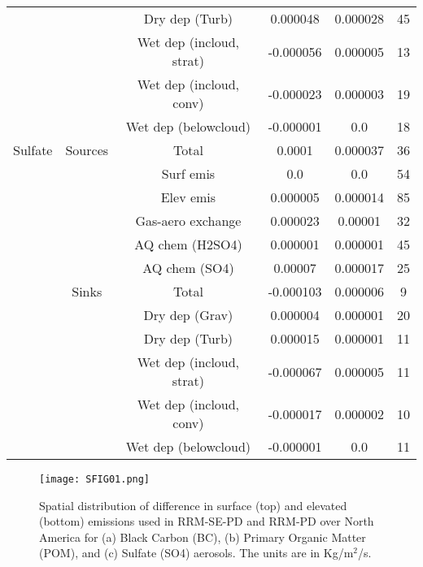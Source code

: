 \documentclass[journal abbreviation, manuscript]{copernicus}
\begin{document}
\begin{table}
\begin{tabular}{c|c|c|c|c|c}
             &      &     Dry dep (Turb) &     0.000048 &     0.000028 &     45 \\
             &      &            Wet dep (incloud, strat) &    -0.000056 &     0.000005 &     13 \\
             &      &            Wet dep (incloud, conv)  &    -0.000023 &     0.000003 &     19 \\
             &      &            Wet dep (belowcloud) &    -0.000001 &          0.0 &     18 \\ \hline
        Sulfate & Sources &              Total &       0.0001 &     0.000037 &     36 \\
             &      &          Surf emis &          0.0 &          0.0 &     54 \\
             &      &          Elev emis &     0.000005 &     0.000014 &     85 \\
             &      &  Gas-aero exchange &     0.000023 &      0.00001 &     32 \\
             &      &    AQ chem (H2SO4) &     0.000001 &     0.000001 &     45 \\
             &      &      AQ chem (SO4) &      0.00007 &     0.000017 &     25 \\ \hline
             &   Sinks &              Total &    -0.000103 &     0.000006 &      9 \\
             &      &     Dry dep (Grav) &     0.000004 &     0.000001 &     20 \\
             &      &     Dry dep (Turb) &     0.000015 &     0.000001 &     11 \\
             &      &            Wet dep (incloud, strat) &    -0.000067 &     0.000005 &     11 \\
             &      &            Wet dep (incloud, conv) &    -0.000017 &     0.000002 &     10 \\
             &      &            Wet dep (belowcloud) &    -0.000001 &          0.0 &     11 \\ \hline
\end{tabular}
\end{table}


\clearpage
\begin{figure}[t]
\texttt{[image: SFIG01.png]}
\caption{Spatial distribution of difference in surface (top) and elevated (bottom) emissions used in RRM-SE-PD and RRM-PD over North America for (a) Black Carbon (BC), (b) Primary Organic Matter (POM), and (c) Sulfate (SO4) aerosols. The units are in Kg/m$^{2}$/s. }
\end{figure}
\end{document}
